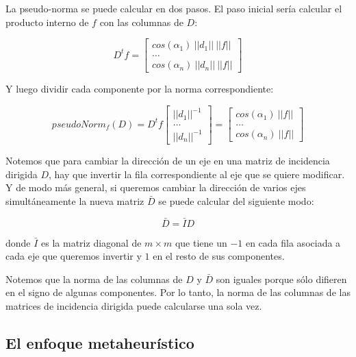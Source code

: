 \documentclass[10pt, a4paper, twocolumn]{article} %
\begin{document}
\smallskip

La pseudo-norma se puede calcular en dos pasos. El paso inicial sería 
calcular el producto interno de $f$ con las columnas de $D$:

$$
D^t f = \begin{bmatrix}
	cos(\alpha_1) \ ||d_1|| \ ||f||\\
	\dots \\
	cos(\alpha_n) \ ||d_n|| \ ||f||
\end{bmatrix}
$$

\smallskip

Y luego dividir cada componente por la norma correspondiente:

$$
pseudoNorm_f(D) = D^t f
\begin{bmatrix}
	||d_1||^{-1}\\
	\dots \\
	||d_n||^{-1}
\end{bmatrix} = \begin{bmatrix}
	cos(\alpha_1) \ ||f||\\
	\dots \\
	cos(\alpha_n) \ ||f||
\end{bmatrix}
$$

\smallskip

Notemos que para cambiar la dirección de un eje en una matriz de 
incidencia dirigida $D$, hay que invertir la fila correspondiente al 
eje que se quiere modificar. Y de modo más general, si queremos cambiar 
la dirección de varios ejes simultáneamente la nueva matriz $\bar{D}$
se puede calcular del siguiente modo:

$$\bar{D} = \bar{I} D$$

\smallskip

donde $\bar{I}$ es la matriz diagonal de $m \times m$ que tiene un $-1$ 
en cada fila asociada a cada eje que queremos invertir y $1$ en el resto 
de sus componentes.

\smallskip

Notemos que la norma de las columnas de $D$ y $\bar{D}$ son iguales 
porque sólo difieren en el signo de algunas componentes. Por lo tanto, 
la norma de las columnas de las matrices de incidencia dirigida puede 
calcularse una sola vez.

\bigskip

\subsection{El enfoque metaheurístico}
\end{document}
